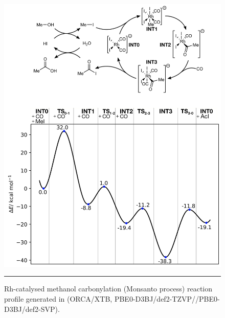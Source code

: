 \documentclass[../../main.tex]{subfiles}
\begin{document}
\iffalse
\begin{figure}[h!]
	\vspace{0.4cm}
	\centering
	\includegraphics[width=14cm]{5/autode/figs/figS19}
	\vspace{0.2cm}
	\hrule
	\caption{Rh-catalysed methanol carbonylation (Monsanto process) reaction profile generated in \ade (ORCA/XTB, PBE0-D3BJ/def2-TZVP//PBE0-D3BJ/def2-SVP).}
	\label{fig::ade_si_19}
\end{figure}
\end{document}
